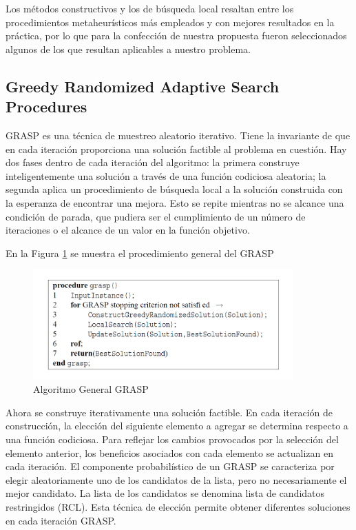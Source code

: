 \documentclass[a4paper,12pt]{book}
\begin{document}
		Los métodos constructivos y los de búsqueda local resaltan entre los procedimientos metaheurísticos más empleados y con mejores resultados en la práctica, por lo que para la confección de nuestra propuesta fueron seleccionados algunos de los que resultan aplicables a nuestro problema. 
	
		\subsection{Greedy Randomized Adaptive Search Procedures} \label{sub:GRASP}
		GRASP \cite{GRASP} es una técnica de muestreo aleatorio iterativo. Tiene la invariante de que en cada iteración proporciona una solución factible al problema en cuestión. Hay dos fases dentro de cada iteración del algoritmo: la primera construye inteligentemente una solución a través de una función codiciosa aleatoria; la segunda aplica un procedimiento de búsqueda local a la solución construida con la esperanza de encontrar una mejora. Esto se repite mientras no se alcance una condición de parada, que pudiera ser el cumplimiento de un número de iteraciones o el alcance de un valor en la función objetivo.
		
		En la Figura \ref{GRASPgeneral} se muestra el procedimiento general del GRASP
		
		\begin{figure}[h]
			\centering
			\includegraphics[width=10cm]{./Graphics/GRASPgeneral.png}
			\caption{Algoritmo General GRASP}
			\label{GRASPgeneral}
		\end{figure}
		
		Ahora se construye iterativamente una solución factible. En cada iteración de construcción, la elección del siguiente elemento a agregar se determina respecto a una función codiciosa. Para reflejar los cambios provocados por la selección del elemento anterior, los beneficios asociados con cada elemento se actualizan en cada iteración. El componente probabilístico de un GRASP se caracteriza por elegir aleatoriamente uno de los candidatos de la lista, pero no necesariamente el mejor candidato. La lista de los candidatos se denomina lista de candidatos restringidos (RCL). Esta técnica de elección permite obtener diferentes soluciones en cada iteración GRASP.
		
\end{document}
